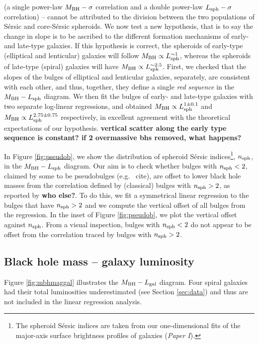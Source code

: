 \documentclass[preprint2]{emulateapj}
\begin{document}
(a single power-law $M_{\rm BH} - \sigma$ correlation and a double power-law $L_{\rm sph} - \sigma$ correlation) -- 
cannot be attributed to the division between the two populations of S\'ersic and core-S\'ersic spheroids.
We now test a new hypothesis, that is to say the change in slope is to be ascribed to the different formation mechanisms of early- and late-type galaxies. 
If this hypothesis is correct, 
the spheroids of early-type (elliptical and lenticular) galaxies will follow $M_{\rm BH} \propto L_{\rm sph}^{\sim 1}$, 
whereas the spheroids of late-type (spiral) galaxies will have $M_{\rm BH} \propto L_{\rm sph}^{\sim 2.5}$.
First, we checked that the slopes of the bulges of elliptical and lenticular galaxies, separately, are consistent with each other, 
and thus, together, they define a single \emph{red sequence} in the $M_{\rm BH} - L_{\rm sph}$ diagram. 
We then fit the bulges of early- and late-type galaxies with two separate log-linear regressions, 
and obtained $M_{\rm BH} \propto L_{\rm sph}^{1 \pm 0.1}$ and $M_{\rm BH} \propto L_{\rm sph}^{2.75 \pm 0.75}$ respectively, 
in excellent agreement with the theoretical expectations of our hypothesis.
{\bf vertical scatter along the early type sequence is constant?
if 2 overmassive bhs removed, what happens?}


In Figure \ref{fig:pseudob}, we show the distribution of spheroid S\'ersic indices\footnote{The spheroid S\'ersic indices 
are taken from our one-dimensional fits of the major-axis surface brightness profiles of galaxies (\emph{Paper I}).}, 
$n_{\rm sph}$, in the $M_{\rm BH} - L_{\rm sph}$ diagram.
Our aim is to check whether bulges with $n_{\rm sph}<2$, claimed by some to be pseudobulges (e.g.~ cite), 
are offset to lower black hole masses from the correlation defined by (classical) bulges with $n_{\rm sph}>2$, 
as reported by \cite{sani2011} {\bf who else?}. 
To do this, we fit a symmetrical linear regression to the bulges that have $n_{\rm sph}>2$ 
and we compute the vertical offset of all bulges from the regression. 
In the inset of Figure \ref{fig:pseudob}, we plot the vertical offset against $n_{\rm sph}$. 
From a visual inspection, bulges with $n_{\rm sph}<2$ do not appear to be offset from the correlation traced by bulges with $n_{\rm sph}>2$.


\subsection{Black hole mass -- galaxy luminosity}
Figure \ref{fig:mbhmaggal} illustrates the $M_{\rm BH} - L_{\rm gal}$ diagram.
Four spiral galaxies had their total luminosities underestimated (see Section \ref{sec:data}) 
and thus are not included in the linear regression analysis. 
\cite{lasker2014anal} 
\end{document}
